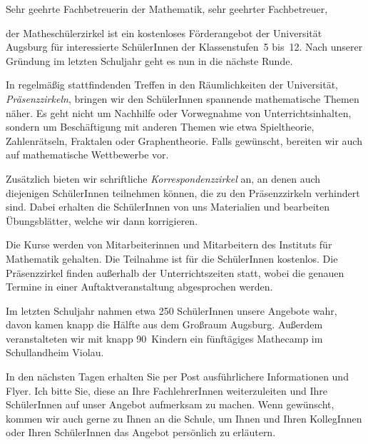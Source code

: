 \documentclass{zirkelbrief}
\begin{document}
\renewcommand{\anschrift}{%
      An die Fachbereiche Mathematik \\
      aller weiterführenden Schulen Schwabens \\
      \\
      }
\renewcommand{\datum}{22.9.2014}
\renewcommand{\betreff}{Matheschülerzirkel der Universität Augsburg}

\makeletterhead

Sehr geehrte Fachbetreuerin der Mathematik, sehr geehrter Fachbetreuer,

der Matheschülerzirkel ist ein kostenloses Förderangebot der Universität Augsburg für interessierte SchülerInnen
der Klassenstufen~5 bis~12. Nach unserer Gründung im letzten Schuljahr geht es nun in die nächste Runde.

In regelmäßig stattfindenden Treffen in den Räum\-lich\-kei\-ten der Universität, \emph{Präsenzzirkeln}, bringen wir
den SchülerInnen spannende mathematische Themen
näher. Es geht nicht um Nachhilfe oder Vorwegnahme von
Unterrichtsinhalten, sondern um Beschäftigung mit anderen Themen wie etwa
Spieltheorie, Zahlenrätseln, Fraktalen oder Graphentheorie. Falls gewünscht,
bereiten wir auch auf mathematische Wettbewerbe vor.

Zusätzlich bieten wir schriftliche \emph{Korrespondenzzirkel} an, an denen auch diejenigen Schü\-ler\-In\-nen teilnehmen können, die zu den Präsenzzirkeln verhindert sind. Dabei erhalten die SchülerInnen von uns
Materialien und bearbeiten Übungsblätter, welche wir dann korrigieren.

Die Kurse werden von Mitarbeiterinnen und Mitarbeitern des
Instituts für Mathematik gehalten. Die Teilnahme ist für die SchülerInnen kostenlos. Die Präsenzzirkel finden
außerhalb der Unterrichtszeiten statt, wobei die genauen Termine in einer
Auftaktveranstaltung abgesprochen werden.

Im letzten Schuljahr nahmen etwa 250 SchülerInnen unsere
Angebote wahr, davon kamen knapp die Hälfte aus dem Großraum Augsburg. Außerdem veranstalteten wir mit knapp 90~Kindern ein fünftägiges Mathecamp im Schullandheim Violau.

In den nächsten Tagen erhalten Sie per Post ausführlichere Informationen und
Flyer. Ich bitte Sie, diese an Ihre
FachlehrerInnen weiterzuleiten und Ihre SchülerInnen auf unser
Angebot aufmerksam zu machen. Wenn gewünscht, kommen wir auch gerne zu Ihnen an die
Schule, um Ihnen und Ihren KollegInnen oder Ihren SchülerInnen das
Angebot persönlich zu erläutern.
\end{document}

